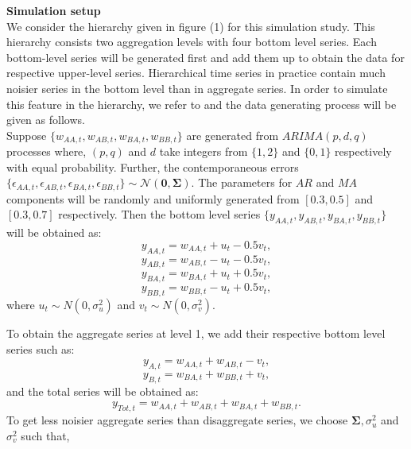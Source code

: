 \documentclass[a4paper, 11pt]{article}
\begin{document}
\noindent
\textbf{Simulation setup}\\

\noindent
We consider the hierarchy given in figure (1) for this simulation study. This hierarchy consists two aggregation levels with four bottom level series. Each bottom-level series will be generated first and add them up to obtain the data for respective upper-level series. Hierarchical time series in practice contain much noisier series in the bottom level than in aggregate series. In order to simulate this feature in the hierarchy, we refer to \citet{Wickramasuriya2017} and the data generating process will be given as follows. \\

\noindent
Suppose $\{w_{AA,t},w_{AB,t},w_{BA,t},w_{BB,t}\}$ are generated from $ARIMA(p,d,q)$ processes where, $(p,q)$ and $d$ take integers from $\{1,2\}$ and $\{0,1\}$ respectively with equal probability. Further, the contemporaneous errors $\{\epsilon_{AA,t},\epsilon_{AB,t},\epsilon_{BA,t},\epsilon_{BB,t}\} \sim \mathcal{N}(\bm{0}, \bm{\Sigma})$. The parameters for $AR$ and $MA$ components will be randomly and uniformly generated from $[0.3,0.5]$ and $[0.3,0.7]$ respectively. Then the bottom level series $\{y_{AA,t},y_{AB,t},y_{BA,t},y_{BB,t}\}$ will be obtained as: 
$$y_{AA,t} = w_{AA,t} + u_t - 0.5v_t,$$
$$y_{AB,t} = w_{AB,t} - u_t - 0.5v_t,$$
$$y_{BA,t} = w_{BA,t} + u_t + 0.5v_t,$$
$$y_{BB,t} = w_{BB,t} - u_t + 0.5v_t,$$ 
\noindent
where $u_t \sim N(0,\sigma^2_u)$ and $v_t \sim N(0,\sigma^2_v)$. 

\noindent
To obtain the aggregate series at level 1, we add their respective bottom level series such as: 
$$y_{A,t} = w_{AA,t} + w_{AB,t} - v_t,$$
$$y_{B,t} = w_{BA,t} + w_{BB,t} + v_t,$$
\noindent
and the total series will be obtained as: 
$$y_{Tot,t} = w_{AA,t} + w_{AB,t} + w_{BA,t} + w_{BB,t}.$$
\noindent
To get less noisier aggregate series than disaggregate series, we choose $\bm{\Sigma}, \sigma^2_u$ and $\sigma^2_v$ such that, 
\end{document}
